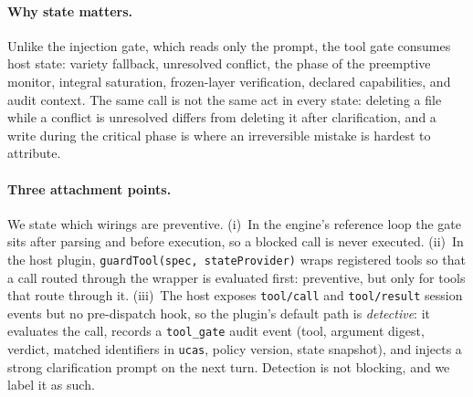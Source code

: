 \paragraph{Why state matters.} Unlike the injection gate, which reads only the
prompt, the tool gate consumes host state: variety fallback, unresolved conflict,
the phase of the preemptive monitor, integral saturation, frozen-layer
verification, declared capabilities, and audit context. The same call is not the
same act in every state: deleting a file while a conflict is unresolved differs
from deleting it after clarification, and a write during the critical phase is
where an irreversible mistake is hardest to attribute.

\paragraph{Three attachment points.} We state which wirings are preventive.
(i)~In the engine's reference loop the gate sits after parsing and before
execution, so a blocked call is never executed. (ii)~In the host plugin,
\texttt{guardTool(spec, stateProvider)} wraps registered tools so that a call
routed through the wrapper is evaluated first: preventive, but only for tools
that route through it. (iii)~The host exposes \texttt{tool/call} and
\texttt{tool/result} session events but no pre-dispatch hook, so the plugin's
default path is \emph{detective}: it evaluates the call, records a
\texttt{tool\_gate} audit event (tool, argument digest, verdict, matched
identifiers in \texttt{ucas}, policy version, state snapshot), and injects a
strong clarification prompt on the next turn. Detection is not blocking, and we
label it as such.

